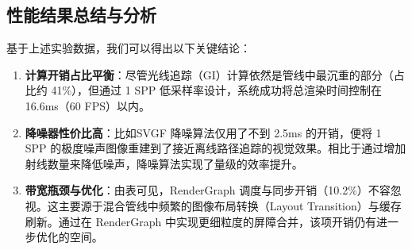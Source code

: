 \subsection{性能结果总结与分析}

基于上述实验数据，我们可以得出以下关键结论：
\begin{enumerate}
    \item \textbf{计算开销占比平衡}：尽管光线追踪（GI）计算依然是管线中最沉重的部分（占比约 41\%），但通过 1 SPP 低采样率设计，系统成功将总渲染时间控制在 16.6ms（60 FPS）以内。
    \item \textbf{降噪器性价比高}：比如SVGF 降噪算法仅用了不到 2.5ms 的开销，便将 1 SPP 的极度噪声图像重建到了接近离线路径追踪的视觉效果。相比于通过增加射线数量来降低噪声，降噪算法实现了量级的效率提升。
    \item \textbf{带宽瓶颈与优化}：由表可见，RenderGraph 调度与同步开销（10.2\%）不容忽视。这主要源于混合管线中频繁的图像布局转换（Layout Transition）与缓存刷新。通过在 RenderGraph 中实现更细粒度的屏障合并，该项开销仍有进一步优化的空间。
\end{enumerate}
